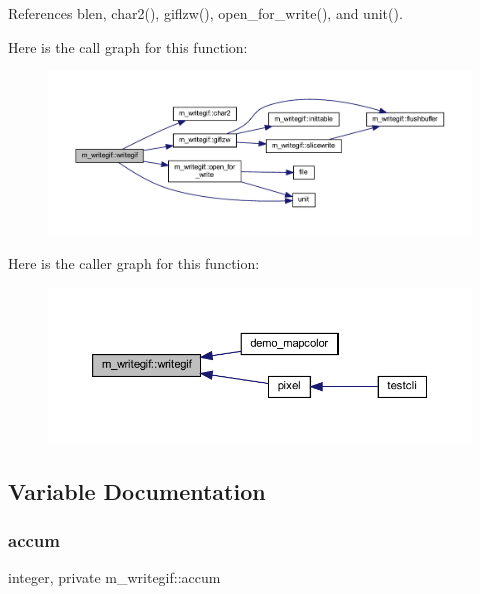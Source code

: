References blen, char2(), giflzw(), open\+\_\+for\+\_\+write(), and unit().

Here is the call graph for this function\+:
\nopagebreak
\begin{figure}[H]
\begin{center}
\leavevmode
\includegraphics[width=350pt]{namespacem__writegif_a02be37849028b2f9484cff1b4285375d_cgraph}
\end{center}
\end{figure}
Here is the caller graph for this function\+:
\nopagebreak
\begin{figure}[H]
\begin{center}
\leavevmode
\includegraphics[width=350pt]{namespacem__writegif_a02be37849028b2f9484cff1b4285375d_icgraph}
\end{center}
\end{figure}


\subsection{Variable Documentation}
\mbox{\label{namespacem__writegif_a2a80a14e30c6ed2b0003d46a93480531}} 
\subsubsection{\texorpdfstring{accum}{accum}}
{\footnotesize\ttfamily integer, private m\+\_\+writegif\+::accum\hspace{0.3cm}{\ttfamily [private]}}

